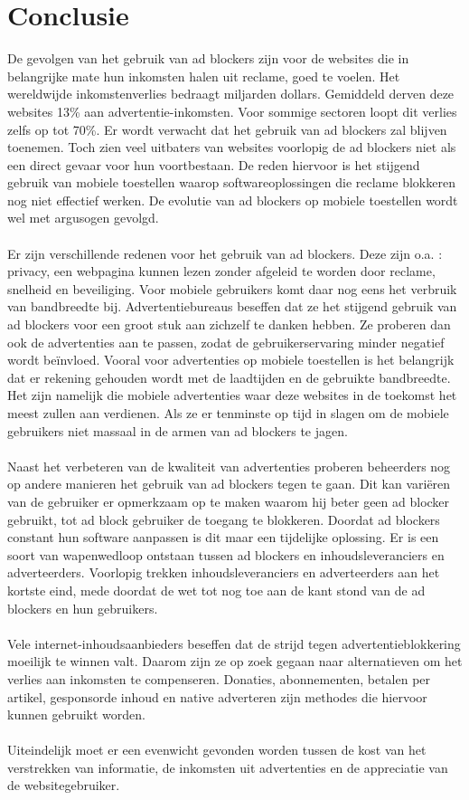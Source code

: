 \documentclass[pdftex,a4paper,12pt,twoside]{report}
\begin{document}
\chapter{Conclusie}
\label{ch:conclusie}
De gevolgen van het gebruik van ad blockers zijn voor de websites die in belangrijke mate hun inkomsten halen uit reclame, goed te voelen. Het wereldwijde inkomstenverlies bedraagt miljarden dollars. Gemiddeld derven deze websites 13\% aan advertentie-inkomsten. Voor sommige sectoren loopt dit verlies zelfs op tot 70\%. Er wordt verwacht dat het gebruik van ad blockers zal blijven toenemen. Toch zien veel uitbaters van websites voorlopig de ad blockers niet als een direct gevaar voor hun voortbestaan. De reden hiervoor is het stijgend gebruik van mobiele toestellen waarop softwareoplossingen die reclame blokkeren nog niet effectief werken. De evolutie van ad blockers op mobiele toestellen wordt wel met argusogen gevolgd. 
\\
\\
Er zijn verschillende redenen voor het gebruik van ad blockers. Deze zijn o.a. : privacy, een webpagina kunnen lezen zonder afgeleid te worden door reclame, snelheid en beveiliging. Voor mobiele gebruikers komt daar nog eens het verbruik van bandbreedte bij. Advertentiebureaus beseffen dat ze het stijgend gebruik van ad blockers voor een groot stuk aan zichzelf te danken hebben. Ze proberen dan ook de advertenties aan te passen, zodat de gebruikerservaring minder negatief wordt beïnvloed. Vooral voor advertenties op mobiele toestellen is het belangrijk dat er rekening gehouden wordt met de laadtijden en de gebruikte bandbreedte. Het zijn namelijk die mobiele advertenties waar deze websites in de toekomst het meest zullen aan verdienen. Als ze er tenminste op tijd in slagen om de mobiele gebruikers niet massaal in de armen van ad blockers te jagen.
\\
\\
Naast het verbeteren van de kwaliteit van advertenties proberen beheerders nog op andere manieren het gebruik van ad blockers tegen te gaan. Dit kan variëren van de gebruiker er opmerkzaam op te maken waarom hij beter geen ad blocker gebruikt, tot ad block gebruiker de toegang te blokkeren. Doordat ad blockers constant hun software aanpassen is dit maar een tijdelijke oplossing. Er is een soort van wapenwedloop ontstaan tussen ad blockers en inhoudsleveranciers en adverteerders. Voorlopig trekken inhoudsleveranciers en adverteerders aan het kortste eind, mede doordat de wet tot nog toe aan de kant stond van de ad blockers en hun gebruikers. 
\\
\\
Vele internet-inhoudsaanbieders beseffen dat de strijd tegen advertentieblokkering moeilijk te winnen valt. Daarom zijn ze op zoek gegaan naar alternatieven om het verlies aan inkomsten te compenseren. Donaties, abonnementen, betalen per artikel, gesponsorde inhoud en native adverteren zijn methodes die hiervoor kunnen gebruikt worden.
\\
\\
Uiteindelijk moet er een evenwicht gevonden worden tussen de kost van het verstrekken van informatie, de inkomsten uit advertenties en de appreciatie van de websitegebruiker.
\end{document}
